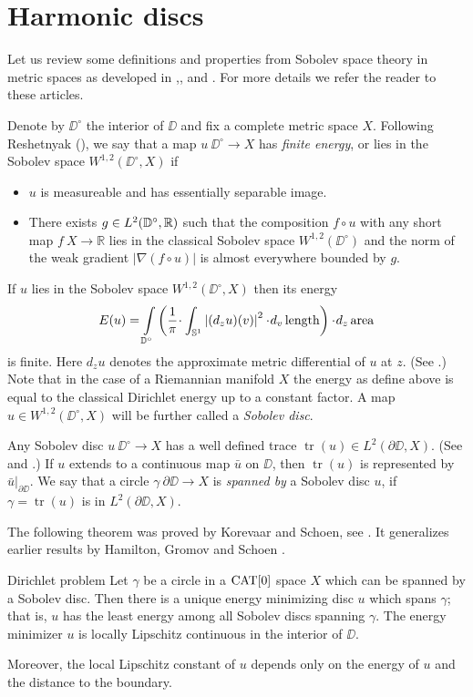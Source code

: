\documentclass{article}
\begin{document}
\section{Harmonic discs}\label{Harmonic discs}

Let us review some definitions and properties from Sobolev space theory in metric spaces as developed in 
\cite{KS},\cite{R}, \cite{HKST} and \cite{LW}. 
For more details we refer the reader to these articles.

Denote by  $\DD^\circ$ the interior of $\DD$ and fix a complete metric space $X$.
Following Reshetnyak (\cite{R}), we say that a map $u\:\DD^\circ\to X$ has {\em finite energy}, or lies in the Sobolev space $W^{1,2}(\DD^\circ,X)$ if
\begin{itemize}
 \item $u$ is measureable and has essentially separable image. %
 \item There exists $g\in L^2(\mathbb{D}^\circ,\mathbb{R})$ such that the composition $f\circ u$ with any short map $f\:X\to \mathbb{R}$ 
lies in the classical Sobolev space $W^{1,2}(\DD^\circ)$
 and the norm of the weak gradient $|\nabla(f\circ u)|$ is almost everywhere bounded by $g$.
\end{itemize}

If $u$ lies in the Sobolev space $W^{1,2}(\DD^\circ,X)$ then its energy 
\[E(u)=
\int\limits_{\DD^\circ}\left(\frac{1}{\pi}\cdot\int_{\mathbb{S}^1}\left|(d_zu)(v)\right|^2\cdot d_v\length\right)\cdot d_z\area\]
is finite. 
Here $d_zu$ denotes the approximate metric differential of $u$ at $z$.
(See \cite{LW}.)
Note that in the case of a Riemannian manifold $X$ the energy as define above is equal to
the classical Dirichlet energy up to a constant factor.
A map $u\in W^{1,2}(\DD^\circ,X)$ will be further called a \emph{Sobolev disc}.

Any Sobolev disc $u\:\DD^\circ\to X$ has a well defined trace $\operatorname{tr}(u)\in L^2(\partial\DD,X)$. 
(See \cite{KS} and \cite{LW}.)
If $u$ extends to a continuous map $\bar u$ on $\DD$, then $\operatorname{tr}(u)$ is represented by $\bar u|_{\partial\DD}$. 
We say that a circle $\gamma\:\partial\DD\to X$ is {\em spanned by} a Sobolev disc $u$, if $\gamma=\operatorname{tr}(u)$ is in 
$L^2(\partial\DD,X)$.

The following theorem was proved by Korevaar and Schoen,
see \cite[theorems 2.2 and 2.4.6]{KS}. 
It generalizes earlier results by Hamilton, Gromov and Schoen  \cite{H,GS}.

\begin{thm}{Dirichlet problem}\label{thm:dirichlet}
Let $\gamma$ be a circle in a $\mathop{\rm CAT}\nolimits[0]$ space $X$ which can be spanned by a Sobolev disc. 
Then there is a unique energy minimizing disc $u$ which spans $\gamma$; 
that is, $u$
has the least energy among all Sobolev discs spanning $\gamma$. 
The energy minimizer $u$ is locally Lipschitz continuous in the interior of $\DD$.

Moreover, the local Lipschitz constant of $u$ depends only on the energy of $u$ and the distance to the boundary.
\end{thm}
\end{document}
